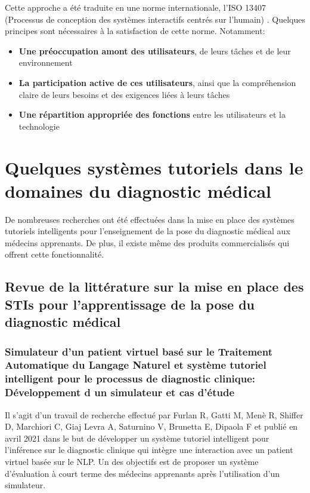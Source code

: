     Cette approche a été traduite en une norme internationale, l’ISO 13407 (Processus de conception des systèmes interactifs centrés sur l’humain) \cite{iso13407}. Quelques principes sont nécessaires à la satisfaction de cette norme. Notamment:
    \begin{itemize}
        \item  \textbf{Une préoccupation amont des utilisateurs}, de leurs tâches et de leur environnement
        \item \textbf{ La participation active de ces utilisateurs}, ainsi que la compréhension claire de leurs besoins et des exigences liées à
leurs tâches
        \item \textbf{Une répartition appropriée des fonctions} entre les utilisateurs et la technologie
    \end{itemize}

\newpage

\section{Quelques systèmes tutoriels dans le domaines du diagnostic médical}
De nombreuses recherches ont été effectuées dans la mise en place des systèmes tutoriels intelligents pour l'enseignement de la pose du diagnostic médical aux médecins apprenants. De plus, il existe même des produits commercialisés qui offrent cette fonctionnalité.

\subsection{Revue de la littérature sur la mise en place des STIs pour l'apprentissage de la pose du diagnostic médical}

\subsubsection{Simulateur d'un patient virtuel basé sur le Traitement Automatique du Langage Naturel et système tutoriel intelligent pour le processus de diagnostic clinique: Développement d un simulateur et cas d'étude}
Il s'agit d'un travail de recherche effectué par Furlan R, Gatti M, Menè R, Shiffer D, Marchiori C, Giaj Levra A, Saturnino V, Brunetta E, Dipaola F et publié en avril 2021 dans le but de développer un système tutoriel intelligent pour l'inférence sur le  diagnostic clinique qui intègre une interaction avec un patient virtuel basée sur le NLP. Un des objectifs est de proposer un système d'évaluation à court terme des médecins apprenants après l'utilisation d'un simulateur.

